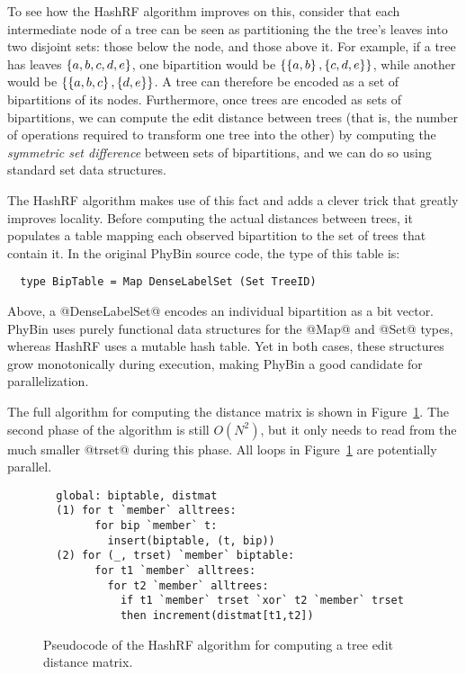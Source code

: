 To see how the HashRF algorithm improves on this, consider that each
intermediate node of a tree can be seen as partitioning the the tree's
leaves into two disjoint sets: those below the node, and those above
it.  For example, if a tree has leaves $\left\{a, b, c, d, e\right\}$, one
bipartition would be $\left\{\left\{a, b\right\}, \left\{c, d, e\right\}\right\}$, while
another would be $\left\{\left\{a, b, c\right\}, \left\{d, e\right\}\right\}$.  A tree can
therefore be encoded as a set of bipartitions of its nodes.
Furthermore, once trees are encoded as sets of bipartitions, we can
compute the edit distance between trees (that is, the number of
operations required to transform one tree into the other) by computing
the \emph{symmetric set difference} between sets of bipartitions, and
we can do so using standard set data structures.

The HashRF algorithm makes use of this fact and adds a clever trick
that greatly improves locality.  Before computing the actual distances
between trees, it populates a table mapping each observed bipartition
to the set of trees that contain it.  In the original PhyBin source
code, the type of this table is:

\begin{lstlisting}
  type BipTable = Map DenseLabelSet (Set TreeID)
\end{lstlisting}

Above, a @DenseLabelSet@ encodes an individual bipartition as a bit
vector.  PhyBin uses purely functional data structures for the @Map@
and @Set@ types, whereas HashRF uses a mutable hash table.  Yet in
both cases, these structures grow monotonically during execution,
making PhyBin a good candidate for parallelization.

The full algorithm for computing the distance matrix is shown in
Figure~\ref{f:hashrf-alg}.  The second phase of the algorithm is still
$O(N^2)$, but it only needs to read from the much smaller @trset@
during this phase.  All loops in Figure~\ref{f:hashrf-alg} are
potentially parallel.

\begin{figure}
\begin{lstlisting}
  global: biptable, distmat
  (1) for t `member` alltrees:
        for bip `member` t:
          insert(biptable, (t, bip))
  (2) for (_, trset) `member` biptable: 
        for t1 `member` alltrees:
          for t2 `member` alltrees:
            if t1 `member` trset `xor` t2 `member` trset
            then increment(distmat[t1,t2])
\end{lstlisting}  
  \caption{Pseudocode of the HashRF algorithm for computing a tree
    edit distance matrix.}
  \label{f:hashrf-alg}
\end{figure}

